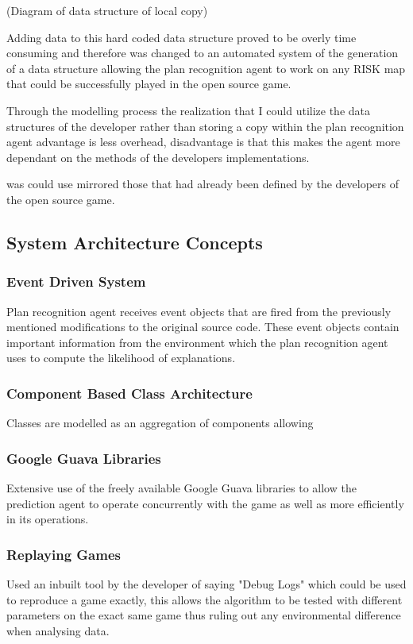 \documentclass[parskip]{cs4rep}
\begin{document}
(Diagram of data structure of local copy)

Adding data to this hard coded data structure proved to be overly time consuming and therefore was changed to an automated system of the generation of a data structure allowing the plan recognition agent to work on any RISK map that could be successfully played in the open source game.

Through the modelling process the realization that I could utilize the data structures of the developer rather than storing a copy within the plan recognition agent advantage is less overhead, disadvantage is that this makes the agent more dependant on the methods of the developers implementations.

 was could use mirrored those that had already been defined by the developers of the open source game.

\subsection{System Architecture Concepts}

\subsubsection{Event Driven System}

Plan recognition agent receives event objects that are fired from the previously mentioned modifications to the original source code. These event objects contain important information from the environment which the plan recognition agent uses to compute the likelihood of explanations.

\subsubsection{Component Based Class Architecture}

Classes are modelled as an aggregation of components allowing

\subsubsection{Google Guava Libraries}

Extensive use of the freely available Google Guava libraries to allow the prediction agent to operate concurrently with the game as well as more efficiently in its operations.

\subsubsection{Replaying Games}
Used an inbuilt tool by the developer of saying "Debug Logs" which could be used to reproduce a game exactly, this allows the algorithm to be tested with different parameters on the exact same game thus ruling out any environmental difference when analysing data.
\end{document}
